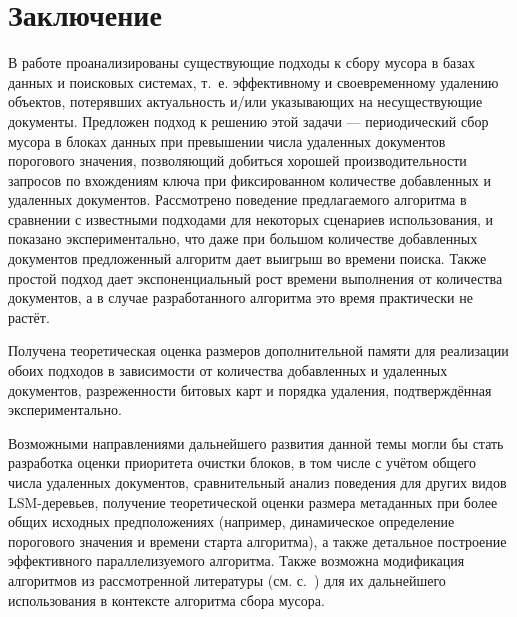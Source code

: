 \newpage
\section{Заключение}

В работе проанализированы существующие подходы к сбору мусора в базах данных
и поисковых системах, т.~е. эффективному и своевременному удалению объектов,
потерявших актуальность и/или указывающих на несуществующие документы.
Предложен подход к решению этой задачи --- периодический сбор мусора в блоках
данных при превышении числа удаленных документов порогового значения,
позволяющий добиться хорошей производительности запросов по вхождениям
ключа при фиксированном количестве добавленных и удаленных документов. Рассмотрено поведение
предлагаемого алгоритма в сравнении с известными подходами для некоторых
сценариев использования, и показано экспериментально, что
даже при большом количестве добавленных документов
предложенный алгоритм дает выигрыш во времени поиска. Также
простой подход дает экспоненциальный рост времени выполнения от количества
документов, а в случае разработанного алгоритма это время практически
не растёт.

Получена теоретическая оценка размеров дополнительной памяти для реализации
обоих подходов в зависимости от количества добавленных и удаленных документов,
разреженности битовых карт и порядка удаления, подтверждённая экспериментально.

Возможными направлениями дальнейшего развития данной темы могли бы
стать разработка оценки приоритета очистки блоков, в том числе с учётом
общего числа удаленных документов, сравнительный анализ поведения для других
видов LSM-деревьев, получение теоретической оценки размера метаданных при более общих
исходных предположениях (например, динамическое определение порогового значения
и времени старта алгоритма), а также детальное построение эффективного
параллелизуемого алгоритма. Также возможна модификация алгоритмов из рассмотренной
литературы (см. с.~\pageref{FeGC}) для их дальнейшего использования в контексте
алгоритма сбора мусора.
